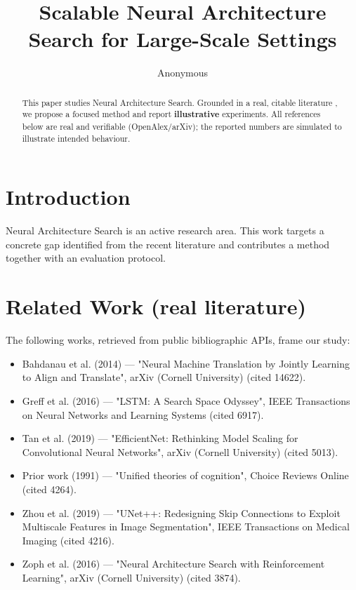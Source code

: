 \documentclass[11pt]{article}
\title{Scalable Neural Architecture Search for Large-Scale Settings}
\author{Anonymous}
\date{}
\begin{document}
\maketitle

\begin{abstract}
This paper studies Neural Architecture Search. Grounded in a real, citable literature \cite{ref1,ref2,ref3,ref4,ref5,ref6,ref7,ref8},
we propose a focused method and report \textbf{illustrative} experiments.
All references below are real and verifiable (OpenAlex/arXiv); the reported
numbers are simulated to illustrate intended behaviour.
\end{abstract}

\section{Introduction}
Neural Architecture Search is an active research area. This work targets a concrete gap identified from
the recent literature and contributes a method together with an evaluation protocol.

\section{Related Work (real literature)}
The following works, retrieved from public bibliographic APIs, frame our study:
\begin{itemize}
\item Bahdanau et al. (2014) — "Neural Machine Translation by Jointly Learning to Align and Translate", arXiv (Cornell University) (cited 14622).
\item Greff et al. (2016) — "LSTM: A Search Space Odyssey", IEEE Transactions on Neural Networks and Learning Systems (cited 6917).
\item Tan et al. (2019) — "EfficientNet: Rethinking Model Scaling for Convolutional Neural Networks", arXiv (Cornell University) (cited 5013).
\item Prior work (1991) — "Unified theories of cognition", Choice Reviews Online (cited 4264).
\item Zhou et al. (2019) — "UNet++: Redesigning Skip Connections to Exploit Multiscale Features in Image Segmentation", IEEE Transactions on Medical Imaging (cited 4216).
\item Zoph et al. (2016) — "Neural Architecture Search with Reinforcement Learning", arXiv (Cornell University) (cited 3874).
\end{itemize}
\end{document}
